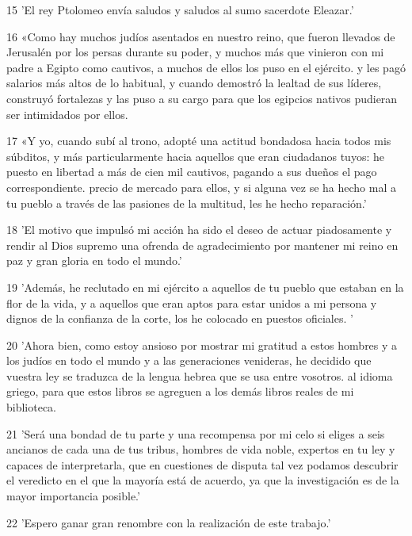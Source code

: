 \par 15 'El rey Ptolomeo envía saludos y saludos al sumo sacerdote Eleazar.'

\par 16 «Como hay muchos judíos asentados en nuestro reino, que fueron llevados de Jerusalén por los persas durante su poder, y muchos más que vinieron con mi padre a Egipto como cautivos, a muchos de ellos los puso en el ejército. y les pagó salarios más altos de lo habitual, y cuando demostró la lealtad de sus líderes, construyó fortalezas y las puso a su cargo para que los egipcios nativos pudieran ser intimidados por ellos.

\par 17 «Y yo, cuando subí al trono, adopté una actitud bondadosa hacia todos mis súbditos, y más particularmente hacia aquellos que eran ciudadanos tuyos: he puesto en libertad a más de cien mil cautivos, pagando a sus dueños el pago correspondiente. precio de mercado para ellos, y si alguna vez se ha hecho mal a tu pueblo a través de las pasiones de la multitud, les he hecho reparación.'

\par 18 'El motivo que impulsó mi acción ha sido el deseo de actuar piadosamente y rendir al Dios supremo una ofrenda de agradecimiento por mantener mi reino en paz y gran gloria en todo el mundo.'

\par 19 'Además, he reclutado en mi ejército a aquellos de tu pueblo que estaban en la flor de la vida, y a aquellos que eran aptos para estar unidos a mi persona y dignos de la confianza de la corte, los he colocado en puestos oficiales. '

\par 20 'Ahora bien, como estoy ansioso por mostrar mi gratitud a estos hombres y a los judíos en todo el mundo y a las generaciones venideras, he decidido que vuestra ley se traduzca de la lengua hebrea que se usa entre vosotros. al idioma griego, para que estos libros se agreguen a los demás libros reales de mi biblioteca.

\par 21 'Será una bondad de tu parte y una recompensa por mi celo si eliges a seis ancianos de cada una de tus tribus, hombres de vida noble, expertos en tu ley y capaces de interpretarla, que en cuestiones de disputa tal vez podamos descubrir el veredicto en el que la mayoría está de acuerdo, ya que la investigación es de la mayor importancia posible.'

\par 22 'Espero ganar gran renombre con la realización de este trabajo.'

